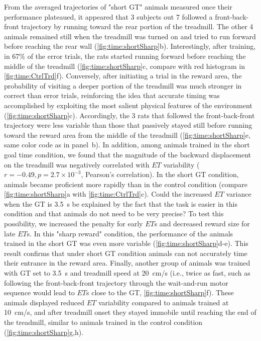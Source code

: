 From the averaged trajectories of "short GT" animals measured once their performance plateaued, it appeared that 3 subjects out 7 followed a front-back-front trajectory by running toward the rear portion of the treadmill.
The other 4 animals remained still when the treadmill was turned on and tried to run forward before reaching the rear wall (\autoref{fig:time:shortSharp}b).
Interestingly, after training, in 67\% of the error trials, the rats started running forward before reaching the middle of the treadmill (\autoref{fig:time:shortSharp}c, compare with red histogram in \autoref{fig:time:CtrlTrd}f).
Conversely, after initiating a trial in the reward area, the probability of visiting a deeper portion of the treadmill was much stronger in correct than error trials, reinforcing the idea that accurate timing was accomplished by exploiting the most salient physical features of the environment (\autoref{fig:time:shortSharp}c).
Accordingly, the 3 rats that followed the front-back-front trajectory were less variable than those that passively stayed still before running toward the reward area from the middle of the treadmill (\autoref{fig:time:shortSharp}e, same color code as in panel~b).
In addition, among animals trained in the short goal time condition, we found that the magnitude of the backward displacement on the treadmill was negatively correlated with $ET$ variability ($r=-0.49, p=2.7\times 10^{-3}$, Pearson's correlation).
In the short GT condition, animals became proficient more rapidly than in the control condition (compare \autoref{fig:time:shortSharp}a with \autoref{fig:time:CtrlTrd}c).
Could the increased $ET$ variance when the GT is 3.5~s be explained by the fact that the task is easier in this condition and that animals do not need to be very precise?
To test this possibility, we increased the penalty for early $ET$s and decreased reward size for late $ET$s.
In this "sharp reward" condition, the performance of the animals trained in the short GT was even more variable (\autoref{fig:time:shortSharp}d-e).
This result confirms that under short GT condition animals can not accurately time their entrance in the reward area.
Finally, another group of animals was trained with GT set to 3.5~s and treadmill speed at 20~cm/s (i.e., twice as fast, such as following the front-back-front trajectory through the wait-and-run motor sequence would lead to $ET$s close to the GT, \autoref{fig:time:shortSharp}f).
These animals displayed reduced $ET$ variability compared to animals trained at 10~cm/s, and after treadmill onset they stayed immobile until reaching the end of the treadmill, similar to animals trained in the control condition (\autoref{fig:time:shortSharp}g,h).
